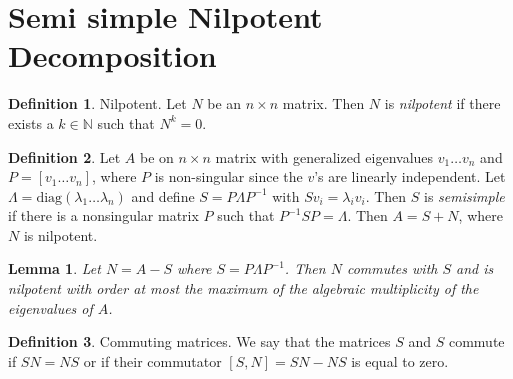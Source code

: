 \documentclass[12pt]{article}
\newtheorem*{lemma}{Lemma}
\theoremstyle{definition}
\newtheorem*{definition}{Definition}
\begin{document}
\section{Semi simple Nilpotent Decomposition}

\begin{definition} Nilpotent.
Let $N$ be an $n \times n$ matrix. Then $N$ is \textit{nilpotent} if there exists a $k \in \mathbb{N}$ such
that $N^k = 0$.
\end{definition}


\begin{definition}
Let $A$ be on $n \times n$ matrix with generalized eigenvalues $v_1 \ldots v_n$ and $P = [v_1 \ldots v_n]$, where $P$ is
non-singular since the $v$'s are linearly independent. Let $\Lambda = \text{diag}(\lambda_1 \ldots \lambda_n)$ and
define $S = P \Lambda P^{-1}$ with $Sv_i = \lambda_i v_i$. Then $S$ is \textit{semisimple} if there is 
a nonsingular matrix $P$ such that $P^{-1}SP = \Lambda$. Then $A = S + N$, where $N$ is nilpotent.
\end{definition}

\begin{lemma}
Let $N = A - S$ where $S = P \Lambda P^{-1}$. Then $N$ commutes with $S$ and is nilpotent with order
at most the maximum of the algebraic multiplicity of the eigenvalues of $A$.
\end{lemma}

\begin{definition} Commuting matrices.
We say that the matrices $S$ and $S$ commute if $SN = NS$ or if their commutator $[S, N] = SN - NS$ is 
equal to zero. 
\end{definition}
\end{document}
